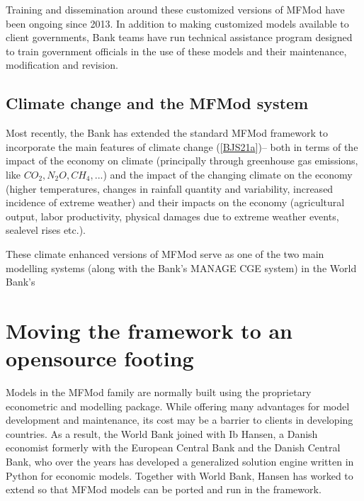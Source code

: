 \documentclass[letterpaper,10pt,english]{jupyterBook}
\begin{document}
\sphinxAtStartPar
Training and dissemination around these customized versions of MFMod have been ongoing since 2013. In addition to making customized models available to client governments, Bank teams have run technical assistance program designed to train government officials in the use of these models and their maintenance, modification and revision.


\subsection{Climate change and the MFMod system}
\label{\detokenize{content/01_Introduction/Introduction:climate-change-and-the-mfmod-system}}
\sphinxAtStartPar
Most recently, the Bank has extended the standard MFMod framework to incorporate the main features of climate change ({[}\hyperlink{cite.content/litterature:id14}{BJS21a}{]})– both in terms of the impact of the economy on climate (principally through green\sphinxhyphen{}house gas emissions, like \(CO_2, N_{2}O, CH_4, ...\)) and the impact of the changing climate on the economy (higher temperatures, changes in rainfall quantity and variability, increased incidence of extreme weather) and their impacts on the economy (agricultural output, labor productivity, physical damages due to extreme weather events, sea\sphinxhyphen{}level rises etc.).

\sphinxAtStartPar
These climate enhanced versions of MFMod serve as one of the two main modelling systems (along with the Bank’s MANAGE CGE system) in the World Bank’s 


\section{Moving the framework to an open\sphinxhyphen{}source footing}
\label{\detokenize{content/01_Introduction/Introduction:moving-the-framework-to-an-open-source-footing}}
\sphinxAtStartPar
Models in the MFMod family are normally built using the proprietary  econometric and modelling package. While offering many advantages for model development and maintenance, its cost may be a barrier to clients in developing countries.  As a result, the World Bank joined with Ib Hansen, a Danish economist formerly with the European Central Bank and the Danish Central Bank, who over the years has developed  a generalized solution engine written in Python for economic models. Together with World Bank, Hansen has worked to extend  so that MFMod models can be ported and run in the framework.
\end{document}
